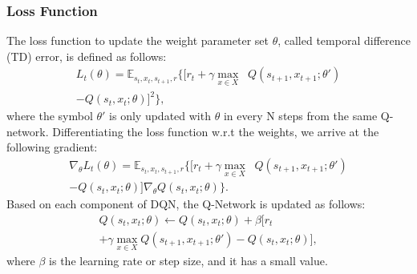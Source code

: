 \documentclass[journal]{IEEEtran}
\begin{document}
		\subsubsection{Loss Function}
			The loss function to update the weight parameter set $\theta$, called temporal difference (TD) error, is defined as follows:
			\begin{equation}
				\begin{aligned}
				{L_t}(\theta ) = {\mathbb{E}_{{s_t},{x_t},{s_{t + 1}},r}}{\{ [r_t + \gamma \mathop {\max }\limits_{x \in X} \;\;Q({s_{t + 1}},{x_{t + 1}};\theta ')} \\ {- Q({s_t},{x_t};\theta )] ^2\} },
				\end{aligned}	
			\end{equation}
			where the symbol ${\theta '}$ is only updated with $\theta$ in every N steps from the same Q-network. Differentiating the loss function w.r.t the weights, we arrive at the following gradient:
			\begin{equation}
				\begin{aligned}
				{\nabla _\theta }{L_t}(\theta ) = {\mathbb{E}_{{s_t},{x_t},{s_{t + 1}},r}}\{ [r_t + \gamma \mathop {\max }\limits_{x \in X} \;\;Q({s_{t + 1}},{x_{t + 1}};\theta ') \\
			 	- Q({s_t},{x_t};\theta )]{\nabla _\theta }Q({s_t},{x_t};\theta )\}.
				\end{aligned}
			\end{equation}
			Based on each component of DQN, the Q-Network is updated as follows:
			\begin{equation}
				\begin{array}{l}
					Q({s_t},{x_t};\theta ) \leftarrow Q({s_t},{x_t};\theta ) + \beta [{r_t}\\
					+ \gamma \mathop {\max }\limits_{x \in X} Q({s_{t + 1}},{x_{t + 1}};\theta ') - Q({s_t},{x_t};\theta )],
				\end{array}
			\end{equation}
			where $\beta$ is the learning rate or step size, and it has a small value.
\end{document}
